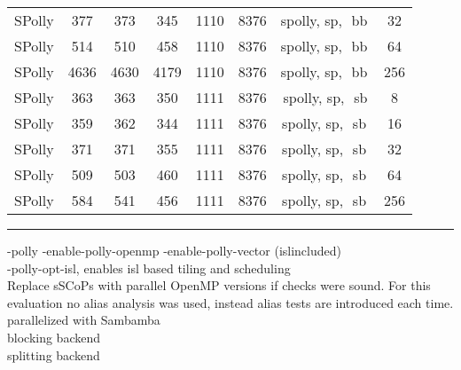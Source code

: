 \begin{table}[h]
\begin{framed}
\begin{tabular}{ c |  c | c | c | c | c | c | c}
    SPolly  & 377 & 373  & 345 & 1110 & 8376 & spolly, sp,\,\, bb\;\, &32\\  
    SPolly  & 514 & 510  & 458  & 1110 & 8376 & spolly, sp,\,\, bb\;\,& 64\\  
    SPolly  & 4636 & 4630 & 4179 & 1110 & 8376 & spolly, sp,\,\, bb\;\,& 256\\  
    SPolly  & 363 & 363 & 350 & 1111 & 8376 & spolly, sp,\,\, sb\footnotemark[6]& 8\\  
    SPolly  & 359 & 362 & 344 & 1111 & 8376 & spolly, sp,\,\, sb\;\,& 16\\  
    SPolly  & 371 & 371 & 355 & 1111 & 8376 & spolly, sp,\,\, sb\;\, & 32\\  
    SPolly  & 509 & 503 & 460 & 1111 & 8376 & spolly, sp,\,\, sb\;\,& 64\\  
    SPolly  & 584 & 541 & 456 & 1111 & 8376 & spolly, sp,\,\, sb\;\, & 256\\  
  \end{tabular}
   
  \end{framed}
\end{table}

\vfill
\vfill
\vfill
\rule{\textwidth}{0.1mm}
\footnotemark[1] -polly -enable-polly-openmp -enable-polly-vector (isl\footnotemark[2] included)\\
\footnotemark[2] -polly-opt-isl, enables isl based tiling and scheduling  \\
\footnotemark[3] Replace sSCoPs with parallel OpenMP versions if checks were sound.  For this evaluation no alias analysis was used, instead alias tests are introduced each time.    \\
\footnotemark[4] parallelized with Sambamba  \\
\footnotemark[5]  blocking backend \\
\footnotemark[6]  splitting backend  



